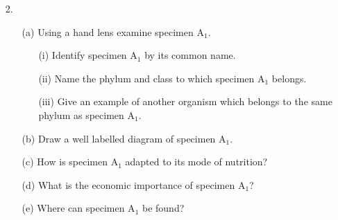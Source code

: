 \begin{enumerate}
\item[2.]
\begin{enumerate}
\item[(a)] Using a hand lens examine specimen A$_1$.
\begin{enumerate}
\item[(i)] Identify specimen A$_1$ by its common name.
\item[(ii)] Name the phylum and class to which specimen A$_1$ belongs.
\item[(iii)] Give an example of another organism which belongs to the same phylum as specimen A$_1$.
\end{enumerate}
\item[(b)] Draw a well labelled diagram of specimen A$_1$.
\item[(c)] How is specimen A$_1$ adapted to its mode of nutrition?
\item[(d)] What is the economic importance of specimen A$_1$?
\item[(e)] Where can specimen A$_1$ be found?
\end{enumerate}
\end{enumerate}
